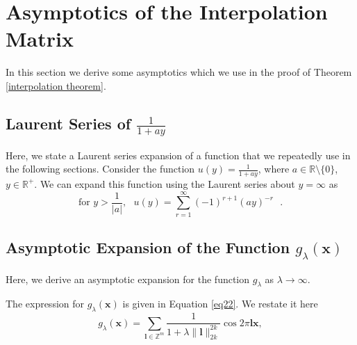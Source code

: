 \documentclass[multixcb]{amstext-l}
\theoremstyle{plain}
\theoremstyle{definition}
\theoremstyle{definition}
\theoremstyle{remark}
\numberwithin{equation}{chapter}
\begin{document}
\section{Asymptotics of the Interpolation Matrix}\label{sec_asymp_exp_interp_matrix}

In this section we derive some asymptotics which we use in the proof of Theorem \ref{interpolation theorem}.

\subsection{Laurent Series of $\frac{1}{1+ay}$}\label{ls_sec}

Here, we state a Laurent series expansion of a function that we repeatedly use in the following sections. Consider the function $u(y) = \frac{1}{1+ay}$, where $a\in \mathbb{R}\setminus\{0\}$,$y\in\mathbb{R}^+$. We can expand this function using the Laurent series about $y=\infty$ as 
\begin{equation}\label{ls}
    \mbox{for  }  y > \frac{1}{|a|},\mbox{  } u(y) = \sum\limits_{r=1}^{\infty}(-1)^{r+1}(ay)^{-r}\mbox{   }.
\end{equation}


\subsection{Asymptotic Expansion of the Function $g_{\lambda}(\boldsymbol{x})$}

Here, we derive an asymptotic expansion for the function $g_{\lambda}$ as $\lambda\to\infty$.

The expression for $g_{\lambda}(\boldsymbol{x})$ is given in Equation \ref{eq22}. We restate it here
\begin{equation}\label{eq22r}
    g_{\lambda}(\boldsymbol{x}) =  \sum_{\boldsymbol{l}\in\mathbb{Z}^m} \frac{1}{1+\lambda\|\boldsymbol{l}\|_{2k}^{2k}} \cos{2\pi\boldsymbol{l}\boldsymbol{x}},
\end{equation}
\end{document}

